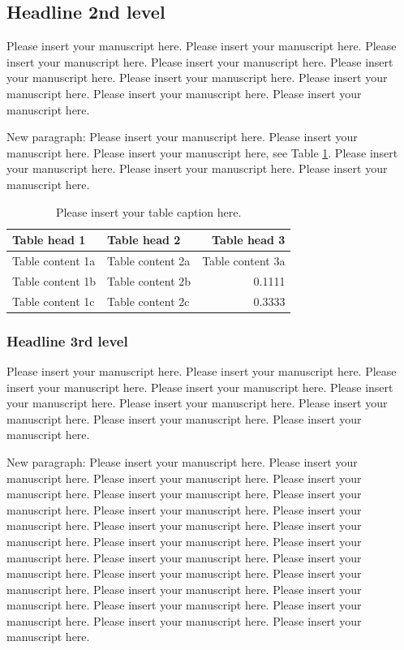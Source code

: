 \documentclass[USenglish,twocolumn]{article}
\begin{document}
  \subsection{Headline 2nd level}
  Please insert your manuscript here. Please insert your manuscript here. Please insert your manuscript here. Please insert your manuscript here. Please insert your manuscript here. Please insert your manuscript here. Please insert your manuscript here. Please insert your manuscript here. Please insert your manuscript here.

  New paragraph: Please insert your manuscript here. Please insert your manuscript here. Please insert your manuscript here, see Table \ref{tab:Table1}. Please insert your manuscript here. Please insert your manuscript here. Please insert your manuscript here.

  \begin{table}
    \caption{Please insert your table caption here.}
    \begin{tabular}{llr}
      Table head 1     & Table head 2     & Table head 3     \\ \midrule
      Table content 1a & Table content 2a & Table content 3a \\
      Table content 1b & Table content 2b & 0.1111           \\
      Table content 1c & Table content 2c & 0.3333           \\
    \end{tabular}
    \label{tab:Table1}
  \end{table}

  \subsubsection{Headline 3rd level}
  Please insert your manuscript here. Please insert your manuscript here. Please insert your manuscript here. Please insert your manuscript here. Please insert your manuscript here. Please insert your manuscript here. Please insert your manuscript here. Please insert your manuscript here. Please insert your manuscript here.

  New paragraph: Please insert your manuscript here. Please insert your manuscript here. Please insert your manuscript here. Please insert your manuscript here. Please insert your manuscript here. Please insert your manuscript here.
  Please insert your manuscript here. Please insert your manuscript here. Please insert your manuscript here. Please insert your manuscript here. Please insert your manuscript here. Please insert your manuscript here. Please insert your manuscript here. Please insert your manuscript here. Please insert your manuscript here. Please insert your manuscript here. Please insert your manuscript here. Please insert your manuscript here. Please insert your manuscript here. Please insert your manuscript here. Please insert your manuscript here. Please insert your manuscript here.
\end{document}
